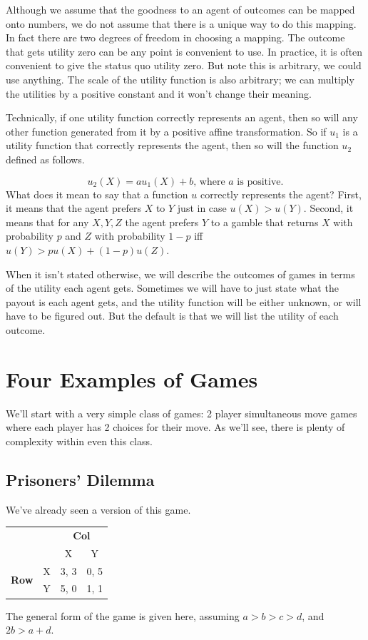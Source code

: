 \documentclass[openany]{book}
\begin{document}
Although we assume that the goodness to an agent of outcomes can be mapped onto numbers, we do not assume that there is a unique way to do this mapping. In fact there are two degrees of freedom in choosing a mapping. The outcome that gets utility zero can be any point is convenient to use. In practice, it is often convenient to give the status quo utility zero. But note this is arbitrary, we could use anything. The scale of the utility function is also arbitrary; we can multiply the utilities by a positive constant and it won't change their meaning.

Technically, if one utility function correctly represents an agent, then so will any other function generated from it by a positive affine transformation. So if $u_1$ is a utility function that correctly represents the agent, then so will the function $u_2$ defined as follows.

\begin{equation*}
u_2(X) = au_1(X) + b \text{, where }a\text{ is positive}.
\end{equation*}
What does it mean to say that a function $u$ correctly represents the agent? First, it means that the agent prefers $X$ to $Y$ just in case $u(X) > u(Y)$. Second, it means that for any $X, Y, Z$ the agent prefers $Y$ to a gamble that returns $X$ with probability $p$ and $Z$ with probability $1-p$ iff $u(Y) > pu(X) + (1-p)u(Z)$.

When it isn't stated otherwise, we will describe the outcomes of games in terms of the utility each agent gets. Sometimes we will have to just state what the payout is each agent gets, and the utility function will be either unknown, or will have to be figured out. But the default is that we will list the utility of each outcome.

\section{Four Examples of Games}
We'll start with a very simple class of games: 2 player simultaneous move games where each player has 2 choices for their move. As we'll see, there is plenty of complexity within even this class.

\subsection{Prisoners' Dilemma}

We've already seen a version of this game.

\begin{center}
\begin{tabular}{l r | c c}
 & & \multicolumn{2}{c}{\textbf{Col}} \\
& & X & Y \\ \hline
\multirow{2}{*}{\textbf{Row}} & X & 3, 3 & 0, 5 \\ & Y & 5, 0 & 1, 1 \\
\end{tabular}
\end{center}
The general form of the game is given here, assuming $a > b > c > d$, and $2b > a + d$.
\end{document}
